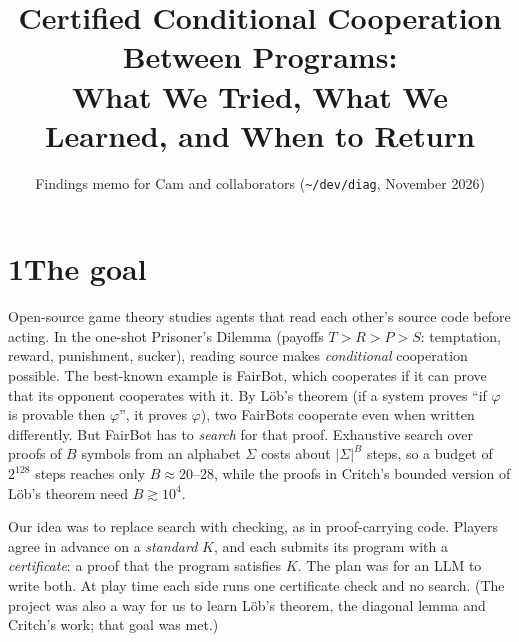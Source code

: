 \documentclass[11pt]{article}
\title{\vspace{-1.5em}Certified Conditional Cooperation Between Programs:\\ What We Tried, What We Learned, and When to Return}
\author{Findings memo for Cam and collaborators \quad (\texttt{\~{}/dev/diag}, November 2026)}
\date{\vspace{-2.5em}}
\begin{document}
\maketitle

\begin{center}
\end{center}

\section*{1\quad The goal}

Open-source game theory studies agents that read each other's source code before acting. In the one-shot Prisoner's Dilemma (payoffs $T > R > P > S$: temptation, reward, punishment, sucker), reading source makes \emph{conditional} cooperation possible. The best-known example is FairBot, which cooperates if it can prove that its opponent cooperates with it. By Löb's theorem (if a system proves ``if $\varphi$ is provable then $\varphi$'', it proves $\varphi$), two FairBots cooperate even when written differently. But FairBot has to \emph{search} for that proof. Exhaustive search over proofs of $B$ symbols from an alphabet $\Sigma$ costs about $|\Sigma|^B$ steps, so a budget of $2^{128}$ steps reaches only $B \approx 20$--$28$, while the proofs in Critch's bounded version of Löb's theorem need $B \gtrsim 10^4$.

Our idea was to replace search with checking, as in proof-carrying code. Players agree in advance on a \emph{standard} $K$, and each submits its program with a \emph{certificate}: a proof that the program satisfies $K$. The plan was for an LLM to write both. At play time each side runs one certificate check and no search. (The project was also a way for us to learn Löb's theorem, the diagonal lemma and Critch's work; that goal was met.)
\end{document}
